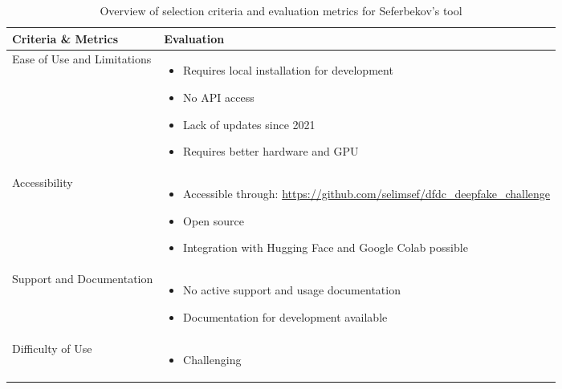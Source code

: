 \begin{table}[htpb]
	\caption{Overview of selection criteria and evaluation metrics for Seferbekov's tool}\label{tab:seferbekov-overview}
	\centering
	\small
	\begin{tabularx}{\textwidth}{l X}
		\toprule
		\textbf{Criteria \& Metrics} & \textbf{Evaluation}                                                                \\
		\midrule
		Ease of Use and Limitations  & \begin{itemize}
			                               \item Requires local installation for development
			                               \item No \ac{API} access
			                               \item Lack of updates since 2021
			                               \item Requires better hardware and \ac{GPU}
		                               \end{itemize}                                   \\
		\addlinespace
		Accessibility                & \begin{itemize}
			                               \item Accessible through: \url{https://github.com/selimsef/dfdc_deepfake_challenge}
			                               \item Open source
			                               \item Integration with Hugging Face and Google Colab possible
		                               \end{itemize} \\
		Support and Documentation    & \begin{itemize}
			                               \item No active support and usage documentation
			                               \item Documentation for development available
		                               \end{itemize}                                     \\
		\addlinespace
		Difficulty of Use            & \begin{itemize}
			                               \item Challenging
		                               \end{itemize}                                                                   \\

\end{tabularx}
\end{table}

